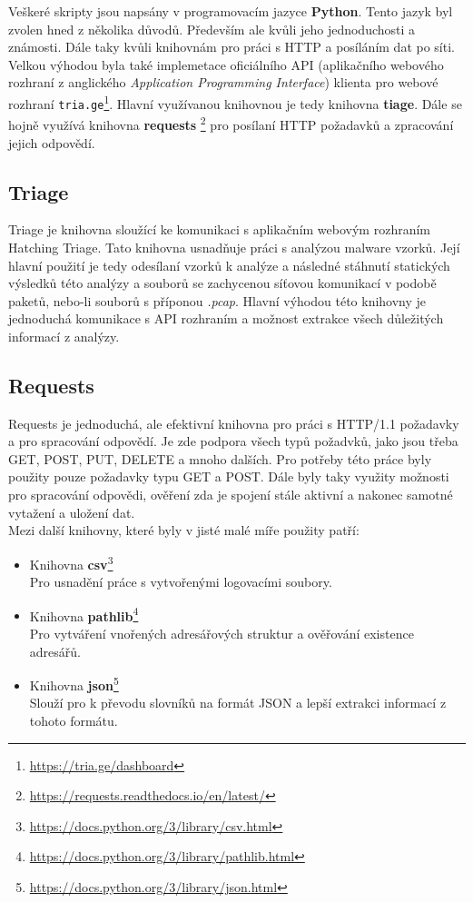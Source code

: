 Veškeré skripty jsou napsány v programovacím jazyce \textbf{Python}. Tento jazyk byl zvolen hned z několika důvodů.
Především ale kvůli jeho jednoduchosti a známosti. Dále taky kvůli knihovnám pro práci s HTTP a posíláním dat po síti.
Velkou výhodou byla také implemetace oficiálního API (aplikačního webového rozhraní z anglického \textit{Application Programming Interface}) klienta pro webové rozhraní 
\texttt{tria.ge}\footnote{\href{https://tria.ge/dashboard}{https://tria.ge/dashboard}}. 
Hlavní využívanou knihovnou je tedy knihovna \textbf{tiage}. Dále se hojně využívá knihovna \textbf{requests} \footnote{\href{https://requests.readthedocs.io/en/latest/}{https://requests.readthedocs.io/en/latest/}}
pro posílaní HTTP požadavků a zpracování jejich odpovědí.

\subsection*{Triage}
Triage je knihovna sloužící ke komunikaci s aplikačním webovým rozhraním Hatching Triage. Tato knihovna usnadňuje práci s analýzou malware vzorků.
Její hlavní použití je tedy odesílaní vzorků k analýze a následné stáhnutí statických výsledků této analýzy a souborů se zachycenou síťovou komunikací v 
podobě paketů, nebo-li souborů s příponou \textit{.pcap}. Hlavní výhodou této knihovny je jednoduchá komunikace s API rozhraním a možnost extrakce všech důležitých
informací z analýzy.

\subsection*{Requests}
Requests je jednoduchá, ale efektivní knihovna pro práci s HTTP/1.1 požadavky a pro spracování odpovědí. Je zde podpora všech typů požadvků, jako jsou
třeba GET, POST, PUT, DELETE a mnoho dalších. Pro potřeby této práce byly použity pouze požadavky typu GET a POST. Dále byly taky využity možnosti
pro spracování odpovědi, ověření zda je spojení stále aktivní a nakonec samotné vytažení a uložení dat.\\ 

Mezi další knihovny, které byly v jisté malé míře použity patří:
\begin{itemize}
    \item Knihovna \textbf{csv}\footnote{\href{https://docs.python.org/3/library/csv.html}{https://docs.python.org/3/library/csv.html}}\\Pro usnadění práce s vytvořenými logovacími soubory.
    \item Knihovna \textbf{pathlib}\footnote{\href{https://docs.python.org/3/library/pathlib.html}{https://docs.python.org/3/library/pathlib.html}}\\Pro vytváření vnořených adresářových struktur a ověřování existence adresářů.
    \item Knihovna \textbf{json}\footnote{\href{https://docs.python.org/3/library/json.html}{https://docs.python.org/3/library/json.html}}\\Slouží pro k převodu slovníků na formát JSON a lepší extrakci informací z tohoto formátu.
\end{itemize}



